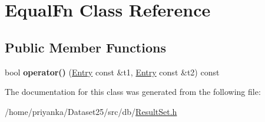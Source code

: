 \hypertarget{classEqualFn}{\section{\-Equal\-Fn \-Class \-Reference}
\label{classEqualFn}
}
\subsection*{\-Public \-Member \-Functions}
\begin{DoxyCompactItemize}
\item 
\hypertarget{classEqualFn_a560a68e974ac2f072925200a3a82c010}{bool {\bfseries operator()} (\hyperlink{classEntry}{\-Entry} const \&t1, \hyperlink{classEntry}{\-Entry} const \&t2) const }\label{classEqualFn_a560a68e974ac2f072925200a3a82c010}

\end{DoxyCompactItemize}


\-The documentation for this class was generated from the following file\-:\begin{DoxyCompactItemize}
\item 
/home/priyanka/\-Dataset25/src/db/\hyperlink{ResultSet_8h}{\-Result\-Set.\-h}\end{DoxyCompactItemize}

